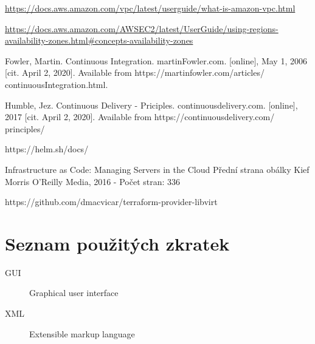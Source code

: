 \documentclass[thesis=M,czech]{FITthesis}[2019/12/23]
\theoremstyle{plain}
\theoremstyle{definition}
\begin{document}
\begin{thebibliography}{9}


\url{https://docs.aws.amazon.com/vpc/latest/userguide/what-is-amazon-vpc.html
}


\url{https://docs.aws.amazon.com/AWSEC2/latest/UserGuide/using-regions-availability-zones.html#concepts-availability-zones
}


Fowler, Martin. Continuous Integration. martinFowler.com. [online], May 1,
2006 [cit. April 2, 2020]. Available from https://martinfowler.com/articles/
continuousIntegration.html.


Humble, Jez. Continuous Delivery - Priciples. continuousdelivery.com. [online],
2017 [cit. April 2, 2020]. Available from https://continuousdelivery.com/
principles/

https://helm.sh/docs/



Infrastructure as Code: Managing Servers in the Cloud
Přední strana obálky
Kief Morris
O'Reilly Media, 2016 - Počet stran: 336


https://github.com/dmacvicar/terraform-provider-libvirt

\end{thebibliography}



\appendix

\chapter{Seznam použitých zkratek}
\begin{description}
	\item[GUI] Graphical user interface
	\item[XML] Extensible markup language
\end{description}
\end{document}
